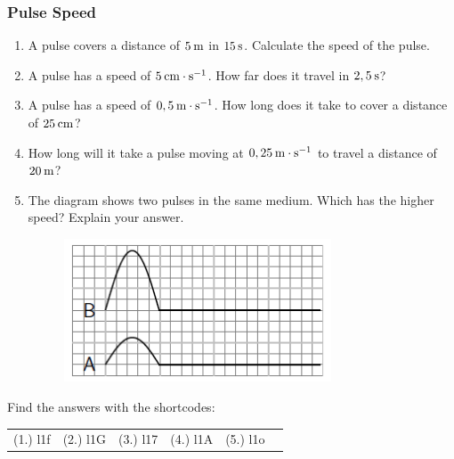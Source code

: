             \subsubsection{  Pulse Speed }
            \nopagebreak
        \label{m38801*id313813}\begin{enumerate}[noitemsep, label=\textbf{\arabic*}. ] 
            \label{m38801*uid7}\item A pulse covers a distance of $5\phantom{\rule{2pt}{0ex}}\mathrm{m}$ in $15\phantom{\rule{2pt}{0ex}}\mathrm{s}$. Calculate the speed of the pulse.\newline
\label{m38801*uid8}\item A pulse has a speed of $5\phantom{\rule{2pt}{0ex}}\mathrm{cm}\ensuremath{\cdot}\mathrm{s}{}^{-1}$. How far does it travel in $2,5\phantom{\rule{2pt}{0ex}}\mathrm{s}$?\newline
\label{m38801*uid9}\item A pulse has a speed of $0,5\phantom{\rule{2pt}{0ex}}\mathrm{m}\ensuremath{\cdot}\mathrm{s}{}^{-1}$. How long does it take to cover a distance of $25\phantom{\rule{2pt}{0ex}}\mathrm{cm}$?\newline
\label{m38801*uid10}\item How long will it take a pulse moving at $0,25\phantom{\rule{2pt}{0ex}}\mathrm{m}\ensuremath{\cdot}\mathrm{s}{}^{-1}$ to travel a distance of $20\phantom{\rule{2pt}{0ex}}\mathrm{m}$?\newline
\label{m38801*uid11}\item The diagram shows two pulses in the same medium. Which has the higher speed? Explain your answer.
    \setcounter{subfigure}{0}
	\begin{figure}[H] %
    \begin{center}
    \label{m38801*id313945!!!underscore!!!media}\label{m38801*id313945!!!underscore!!!printimage}\includegraphics[width=300px]{col11305.imgs/m38801_PG10C4_004.png} %
      \vspace{2pt}
    \vspace{.1in}
    \end{center}
 \end{figure}               \end{enumerate}
  \label{m38801**end}
\par {} Find the answers with the shortcodes:
 \par \begin{tabular}[h]{cccccc}
 (1.) l1f  &  (2.) l1G  &  (3.) l17  &  (4.) l1A  &  (5.) l1o  & \end{tabular}
